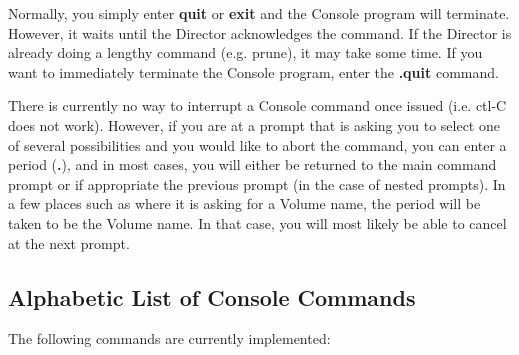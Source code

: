 Normally, you simply enter {\bf quit} or {\bf exit} and the Console program
will terminate. However, it waits until the Director acknowledges the command.
If the Director is already doing a lengthy command (e.g. prune), it may take
some time. If you want to immediately terminate the Console program, enter the
{\bf .quit} command. 

There is currently no way to interrupt a Console command once issued (i.e.
ctl-C does not work). However, if you are at a prompt that is asking you to
select one of several possibilities and you would like to abort the command,
you can enter a period ({\bf .}), and in most cases, you will either be
returned to the main command prompt or if appropriate the previous prompt (in
the case of nested prompts). In a few places such as where it is asking for a
Volume name, the period will be taken to be the Volume name. In that case, you
will most likely be able to cancel at the next prompt. 
\label{list}

\subsection*{Alphabetic List of Console Commands}

The following commands are currently implemented: 


